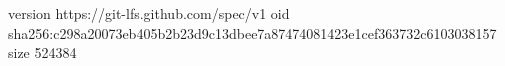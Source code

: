 version https://git-lfs.github.com/spec/v1
oid sha256:c298a20073eb405b2b23d9c13dbee7a87474081423e1cef363732c6103038157
size 524384
